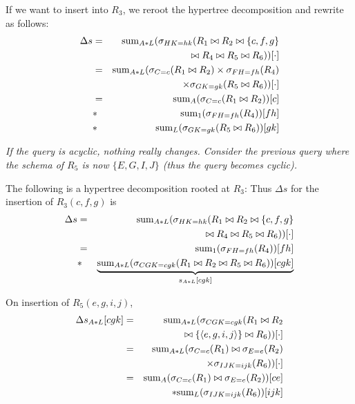 \begin{example}
If we want to insert into $R_3$, we reroot the hypertree decomposition
\comment{
\[
\psset{levelsep=12mm}
\pstree{\TR{\framebox{$R_3\{C,F,G\}$}}}
{
   \pstree{\TR{\framebox{$R_1\{A,B,C\}$}}^C}
   {
      \TR{\framebox{$R_2\{B,D,E\}$}}^B
   }
   \TR{\framebox{$R_4\{F,H\}$}}^{F; [H]}
   \pstree{\TR{\framebox{$R_5\{G,I,J\}$}}_{G; [K]}}
   {
      \TR{\framebox{$R_6\{I,J,K,L\}$}}_{I,J; [K]}
   }
}
\]
}
and rewrite as follows:
\begin{eqnarray*}
\Delta s &=&
\mathrm{sum}_{A*L}(\sigma_{HK=hk}(R_1 \bowtie R_2 \bowtie \{c,f,g\}
\\
&& \quad \bowtie R_4 \bowtie R_5 \bowtie R_6))[\cdot]
\\
&=&
\mathrm{sum}_{A*L}(\sigma_{C=c}(R_1 \bowtie R_2) \times \sigma_{FH=fh}(R_4)
\\
&& \quad
\times \sigma_{GK=gk}(R_5 \bowtie R_6))[\cdot]
\\
&=&
\mathrm{sum}_{A}(\sigma_{C=c}(R_1 \bowtie R_2))[c]
\\
&*& \mathrm{sum}_{1}(\sigma_{FH=fh}(R_4))[fh]
\\
&*& \mathrm{sum}_L(\sigma_{GK=gk}(R_5 \bowtie R_6))[gk]
\end{eqnarray*}
\punto
\end{example}


\begin{example}\em
If the query is acyclic, nothing really changes.
Consider the previous query where the schema of $R_5$ is now
$\{E,G,I,J\}$ (thus the query becomes cyclic).

The following is a hypertree decomposition rooted at $R_3$:
\comment{
\[
\psset{levelsep=12mm}
\pstree{\TR{\framebox{$R_3\{C,F,G\}$}}}
{
   \TR{\framebox{$R_4\{F,H\}$}}^{F; [H]}
   \pstree{\TR{\framebox{$R_1\{A,B,C\}, R_5\{E,G,I,J\}$}}_{C,G; [K]}}
   {
      \TR{\framebox{$R_2\{B,D,E\}$}}^{B,E}
      \TR{\framebox{$R_6\{I,J,K,L\}$}}_{I,J; [K]}
   }
}
\]
}
Thus $\Delta s$ for the insertion of $R_3(c,f,g)$ is
\begin{eqnarray*}
\Delta s &=&
\mathrm{sum}_{A*L}(\sigma_{HK=hk}(R_1 \bowtie R_2 \bowtie \{c,f,g\}
\\
&& \quad \bowtie R_4 \bowtie R_5 \bowtie R_6))[\cdot]
\\
&=&
\mathrm{sum}_{1}(\sigma_{FH=fh}(R_4))[fh]
\\
&*& 
\underbrace{\mathrm{sum}_{A*L}(\sigma_{CGK=cgk}(R_1 \bowtie R_2 \bowtie R_5 \bowtie R_6))[cgk]}_{s_{A*L}[cgk]}
\end{eqnarray*}

On insertion of $R_5(e,g,i,j)$,
\begin{eqnarray*}
\Delta s_{A*L}[cgk]
&=&
\mathrm{sum}_{A*L}(\sigma_{CGK=cgk}(R_1 \bowtie R_2 \\
&& \quad \bowtie \{{\langle e,g,i,j\rangle}\} \bowtie R_6))[\cdot]
\\
&=&
\mathrm{sum}_{A*L}(\sigma_{C=c}(R_1) \bowtie \sigma_{E=e}(R_2) \\
&& \quad \times \sigma_{IJK=ijk}(R_6))[\cdot]
\\
&=&
\mathrm{sum}_{A}(\sigma_{C=c}(R_1) \bowtie \sigma_{E=e}(R_2))[ce] \\
&& \quad * \mathrm{sum}_L(\sigma_{IJK=ijk}(R_6))[ijk]
\end{eqnarray*}
\punto
\end{example}

